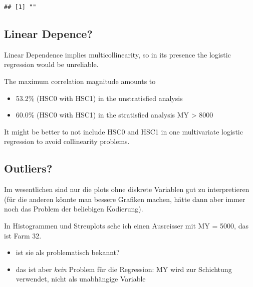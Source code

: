 \documentclass[
]{article}
\providecommand{\tightlist}{%
  \setlength{\itemsep}{0pt}\setlength{\parskip}{0pt}}
\begin{document}
\begin{verbatim}
## [1] ""
\end{verbatim}

\hypertarget{linear-depence}{%
\subsection{Linear Depence?}\label{linear-depence}}

Linear Dependence implies multicollinearity, so in its presence the
logistic regression would be unreliable.

The maximum correlation magnitude amounts to

\begin{itemize}
\tightlist
\item
  53.2\% (HSC0 with HSC1) in the unstratisfied analysis
\item
  60.0\% (HSC0 with HSC1) in the stratisfied analysis MY \textgreater{}
  8000
\end{itemize}

It might be better to not include HSC0 and HSC1 in one multivariate
logistic regression to avoid collinearity problems.

\hypertarget{outliers}{%
\subsection{Outliers?}\label{outliers}}

Im wesentlichen sind nur die plots ohne diskrete Variablen gut zu
interpretieren (für die anderen könnte man bessere Grafiken machen,
hätte dann aber immer noch das Problem der beliebigen Kodierung).

In Histogrammen und Streuplots sehe ich einen Ausreisser mit MY = 5000,
das ist Farm 32.

\begin{itemize}
\tightlist
\item
  ist sie als problematisch bekannt?
\item
  das ist aber \emph{kein} Problem für die Regression: MY wird zur
  Schichtung verwendet, nicht als unabhängige Variable
\end{itemize}
\end{document}
